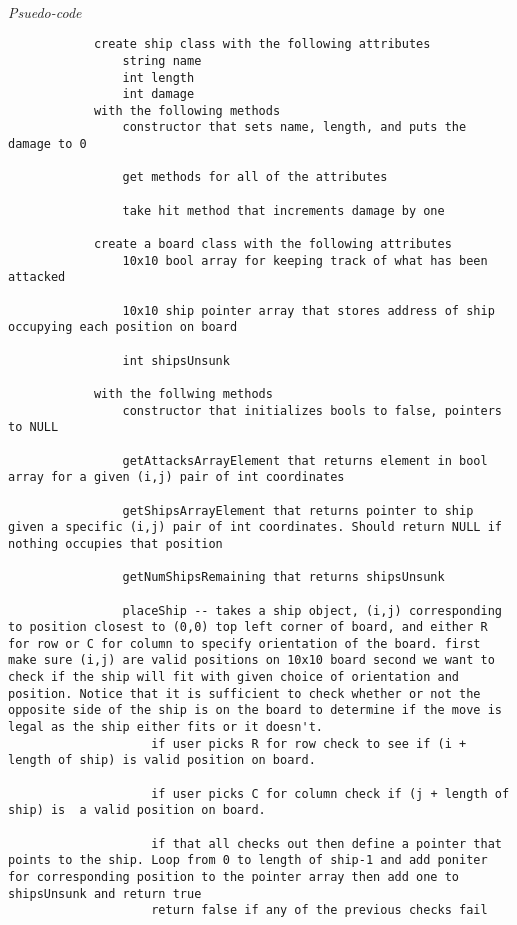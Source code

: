 \documentclass[a4paper, 11pt]{article}
\begin{document}
	\paragraph{}
		\textit{Psuedo-code} 
			\begin{lstlisting}
			create ship class with the following attributes
				string name 
				int length 
				int damage 
			with the following methods 
				constructor that sets name, length, and puts the damage to 0 
				
				get methods for all of the attributes 
				
				take hit method that increments damage by one
				
			create a board class with the following attributes
				10x10 bool array for keeping track of what has been attacked 
					
				10x10 ship pointer array that stores address of ship occupying each position on board
					
				int shipsUnsunk 
					
			with the follwing methods 
				constructor that initializes bools to false, pointers to NULL
				
				getAttacksArrayElement that returns element in bool array for a given (i,j) pair of int coordinates
					
				getShipsArrayElement that returns pointer to ship given a specific (i,j) pair of int coordinates. Should return NULL if nothing occupies that position 
					
				getNumShipsRemaining that returns shipsUnsunk 
					
				placeShip -- takes a ship object, (i,j) corresponding to position closest to (0,0) top left corner of board, and either R for row or C for column to specify orientation of the board. first make sure (i,j) are valid positions on 10x10 board second we want to check if the ship will fit with given choice of orientation and position. Notice that it is sufficient to check whether or not the opposite side of the ship is on the board to determine if the move is legal as the ship either fits or it doesn't. 
					if user picks R for row check to see if (i + length of ship) is valid position on board. 
							
					if user picks C for column check if (j + length of ship) is  a valid position on board. 
						
					if that all checks out then define a pointer that points to the ship. Loop from 0 to length of ship-1 and add poniter for corresponding position to the pointer array then add one to shipsUnsunk and return true 
					return false if any of the previous checks fail 
					

\end{lstlisting}
\end{document}
